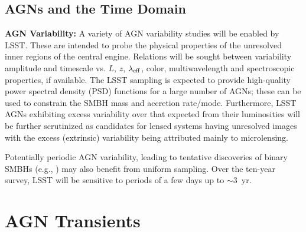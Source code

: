 \subsection{AGNs and the Time Domain}
\label{sec:\secname:time}

{\bf AGN Variability:} A variety of AGN variability studies will be
enabled by LSST. These are intended to probe the physical properties
of the unresolved inner regions of the central engine. Relations will
be sought between variability amplitude and timescale vs. $L$, $z$,
$\lambda_{\rm eff}$, color, multiwavelength and spectroscopic
properties, if available. The LSST sampling is expected to provide
high-quality power spectral density (PSD) functions for a large number
of AGNs; these can be used to constrain the SMBH mass and accretion
rate/mode. Furthermore, LSST AGNs exhibiting excess variability over
that expected from their luminosities will be further scrutinized as
candidates for lensed systems having unresolved images with the excess
(extrinsic) variability being attributed mainly to microlensing.

Potentially periodic AGN variability, leading to tentative discoveries
of binary SMBHs (e.g., \citet{GrahamEtal2015}) may also benefit from
uniform sampling. Over the ten-year survey, LSST will be sensitive
to periods of a few days up to $\sim3$~yr.





% 


% 


% 








\section{AGN Transients}

